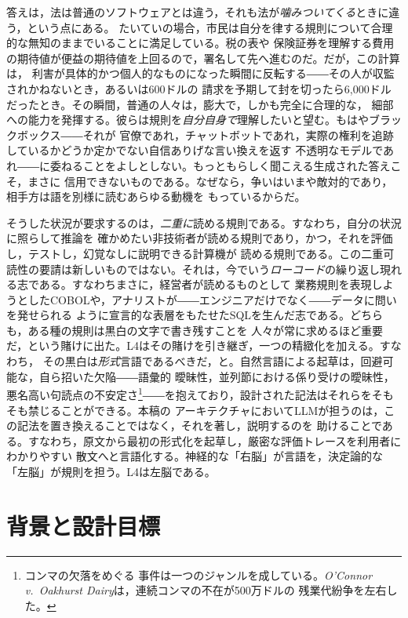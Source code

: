 \documentclass[11pt,a4paper]{ltjsarticle}
\begin{document}
答えは，法は普通のソフトウェアとは違う，それも法が\emph{噛みついてくる}ときに違う，という点にある。
たいていの場合，市民は自分を律する規則について合理的な無知のままでいることに満足している。税の表や
保険証券を理解する費用の期待値が便益の期待値を上回るので，署名して先へ進むのだ。だが，この計算は，
利害が具体的かつ個人的なものになった瞬間に反転する――その人が収監されかねないとき，あるいは600ドルの
請求を予期して封を切ったら6{,}000ドルだったとき。その瞬間，普通の人々は，膨大で，しかも完全に合理的な，
細部への能力を発揮する。彼らは規則を\emph{自分自身で}理解したいと望む。もはやブラックボックス――それが
官僚であれ，チャットボットであれ，実際の権利を追跡しているかどうか定かでない自信ありげな言い換えを返す
不透明なモデルであれ――に委ねることをよしとしない。もっともらしく聞こえる生成された答えこそ，まさに
信用できないものである。なぜなら，争いはいまや敵対的であり，相手方は語を別様に読むあらゆる動機を
もっているからだ。

そうした状況が要求するのは，\emph{二重に}読める規則である。すなわち，自分の状況に照らして推論を
確かめたい非技術者が読める規則であり，かつ，それを評価し，テストし，幻覚なしに説明できる計算機が
読める規則である。この二重可読性の要請は新しいものではない。それは，今でいう\emph{ローコード}の繰り返し現れる志である。すなわちまさに，経営者が読めるものとして
業務規則を表現しようとしたCOBOLや，アナリストが――エンジニアだけでなく――データに問いを発せられる
ように宣言的な表層をもたせたSQLを生んだ志である。どちらも，ある種の規則は黒白の文字で書き残すことを
人々が常に求めるほど重要だ，という賭けに出た。L4はその賭けを引き継ぎ，一つの精緻化を加える。すなわち，
その黒白は\emph{形式}言語であるべきだ，と。自然言語による起草は，回避可能な，自ら招いた欠陥――語彙的
曖昧性，並列節における係り受けの曖昧性，悪名高い句読点の不安定さ\footnote{コンマの欠落をめぐる
事件は一つのジャンルを成している。\emph{O'Connor v.\ Oakhurst Dairy}は，連続コンマの不在が500万ドルの
残業代紛争を左右した。}――を抱えており，設計された記法はそれらをそもそも禁じることができる。本稿の
アーキテクチャにおいてLLMが担うのは，この記法を置き換えることではなく，それを著し，説明するのを
助けることである。すなわち，原文から最初の形式化を起草し，厳密な評価トレースを利用者にわかりやすい
散文へと言語化する。神経的な「右脳」が言語を，決定論的な「左脳」が規則を担う。L4は左脳である。

\section{背景と設計目標}\label{sec:background}
\end{document}
